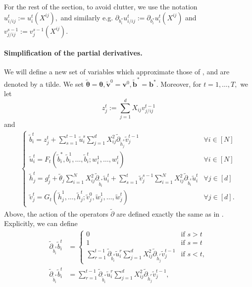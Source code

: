 \documentclass{article}
\newcommand{\1}{\mathbbm{1}}
\theoremstyle{plain}
\theoremstyle{definition}
\theoremstyle{remark}
\newcommand{\bfv}{\boldsymbol{v}}
\newcommand{\bfb}{\boldsymbol{b}}
\newcommand{\bftheta}{\boldsymbol{\theta}}
\begin{document}
For the rest of the section, to avoid clutter, we use the notation $u_{i/ij}^t:= u_{i}^t(X^{ij}),$ and similarly e.g. $\partial_{b^*_i}u_{i/ij}^t:= \partial_{b^*_i}u_{i}^t(X^{ij})$ and $v_{j/ij}^{s-1}:= v_{j}^{s-1}(X^{ij}).$

\paragraph{Simplification of the partial derivatives.} We will define a new set of variables which approximate those of , and are denoted by a tilde. We set $\tilde{\bftheta}=\bftheta,\tilde{\bfv}^0=\bfv^0,\tilde{\bfb}^* = \bfb^*.$ Moreover, for $t=1,\dots,T,$ we let
\[
z_j^t := \sum_{j=1}^d X_{ij}v_{j/ij}^{t-1} 
\]
and 
\begin{align*}
    \begin{cases}
        \tilde{b}_i^t = z_j^t + \sum_{s=1}^{t-1} \tilde{u}_i^s \sum_{j=1}^d X_{ij}^2 \tilde{\partial}_{\tilde{h}^s_j} \tilde{v}_j^{t-1} &\forall i\in [N]\\
        \tilde{u}_i^t = F_t(\tilde{b}_i^*, \tilde{b}_i^1,\dots,\tilde{b}_i^t;w^1_i,\dots,w^t_i) &\forall i \in [N] \\
        \tilde{h}_j^t = g_j^t + \tilde{\theta}_j \sum_{i=1}^N X_{ij}^2 \tilde{\partial}_{\tilde{b}_i^*} \tilde{u}_i^t + \sum_{s=1}^t \tilde{v}_j^{s-1}\sum_{i=1}^N X_{ij}^2 \tilde{\partial}_{\tilde{b}_i^s} \tilde{u}_i^t & \forall j\in [d] \\
        \tilde{v}_j^t = G_t(\tilde{h}_j^1,\dots,\tilde{h}_j^t;\tilde{v}_j^0,\tilde{w}^1_j,\dots,\tilde{w}^t_j) & \forall j\in [d].
    \end{cases}
\end{align*}
Above, the action of the operators $\tilde{\partial}$ are defined exactly the same as in . Explicitly, we can define 
\begin{align*}
    \tilde{\partial}_{\tilde{b}_i^s}\tilde{b}_i^t &= \begin{cases}
            0 &\text{if }s>t \\ 
            1 \qquad &\text{if }s=t \\
            \sum_{r=1}^{t-1}\tilde{\partial}_{\tilde{b}_i^s} \tilde{u}_i^{r}\sum_{j=1}^d X_{ij}^2 \tilde{\partial}_{\tilde{h}_j^r} \tilde{v}_{j}^{t-1} & \text{if }s<t,
        \end{cases} \\
        \tilde{\partial}_{\tilde{b}_i^*}\tilde{b}_i^t &= \sum_{r=1}^{t-1}\tilde{\partial}_{\tilde{b}_i^*} \tilde{u}_i^{r}\sum_{j=1}^d X_{ij}^2 \tilde{\partial}_{\tilde{h}_j^r} \tilde{v}_{j}^{t-1},
\end{align*}
\end{document}
